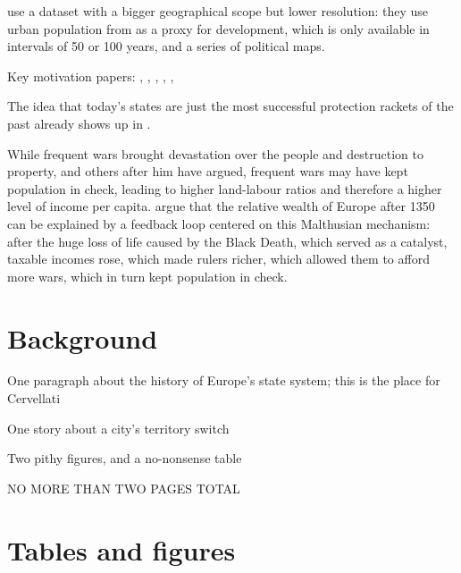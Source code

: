 \documentclass{article}
\begin{document}
\cite{schoenholzer2022} use a dataset with a bigger geographical scope but lower resolution: they use urban population from \cite{bairoch1988} as a proxy for development, which is only available in intervals of 50 or 100 years, and a series of political maps. 




Key motivation papers: \cite{levine2013, levine2021}, \cite{diamond1997}, \cite{schoenholzer2022}, \cite{cervellati2022}, \cite{voigtlnder2013}, \cite{tilly1985}

The idea that today's states are just the most successful protection rackets of the past already shows up in \cite{tilly1985}.

While frequent wars brought devastation over the people and destruction to property, \cite{malthus1798} and others after him have argued, frequent wars may have kept population in check, leading to higher land-labour ratios and therefore a higher level of income per capita. \cite{voigtlnder2013} argue that the relative wealth of Europe after 1350 can be explained by a feedback loop centered on this Malthusian mechanism: after the huge loss of life caused by the Black Death, which served as a catalyst, taxable incomes rose, which made rulers richer, which allowed them to afford more wars, which in turn kept population in check.


\section{Background}


One paragraph about the history of Europe's state system; this is the place for Cervellati

One story about a city's territory switch

Two pithy figures, and a no-nonsense table

NO MORE THAN TWO PAGES TOTAL






\newpage
\onehalfspacing



\newpage
\section*{Tables and figures}
\end{document}
